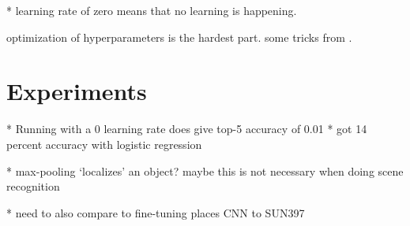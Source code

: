 \documentclass[10pt]{article}
\begin{document}
* learning rate of zero means that no learning is happening. 

optimization of hyperparameters is the hardest part. some tricks from \cite{bottou_large-scale_2010}.

\section{Experiments}

* Running with a 0 learning rate does give top-5 accuracy of 0.01
* got 14 percent accuracy with logistic regression

* max-pooling `localizes' an object? maybe this is not necessary when doing scene recognition

* need to also compare to fine-tuning places CNN to SUN397



\end{document}
